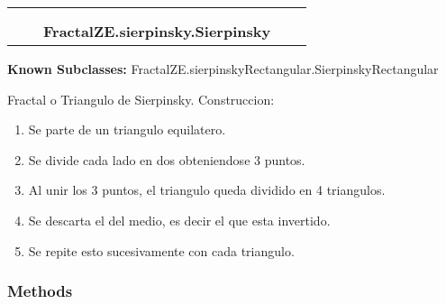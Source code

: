     \label{FractalZE:sierpinsky:Sierpinsky}
\begin{tabular}{cccccc}
\multicolumn{2}{r}{\settowidth{\BCL}{FractalZE.fractal.Fractal}\multirow{2}{\BCL}{FractalZE.fractal.Fractal}}
&&
  \\\cline{3-3}
  &&\multicolumn{1}{c|}{}
&&
  \\
&&\multicolumn{2}{l}{\textbf{FractalZE.sierpinsky.Sierpinsky}}
\end{tabular}

\textbf{Known Subclasses:} FractalZE.sierpinskyRectangular.SierpinskyRectangular

Fractal o Triangulo de Sierpinsky. Construccion:

\begin{enumerate}

\setlength{\parskip}{0.5ex}
  \item Se parte de un triangulo equilatero.

  \item Se divide cada lado en dos obteniendose 3 puntos.

  \item Al unir los 3 puntos, el triangulo queda dividido en 4 triangulos.

  \item Se descarta el del medio, es decir el que esta invertido.

  \item Se repite esto sucesivamente con cada triangulo.

\end{enumerate}



  \subsubsection{Methods}

    \label{FractalZE:sierpinsky:Sierpinsky:__init__}

    \vspace{0.5ex}

